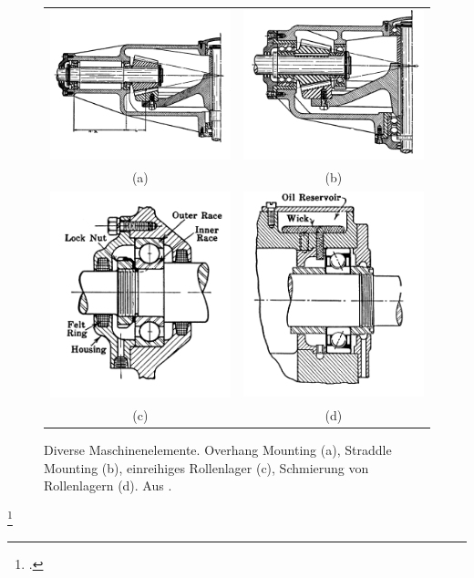 \begin{figure}
\centering\small
\begin{tabular}{cc}
  \includegraphics[width=.45\textwidth]{overhang-mounting} &
  \includegraphics[width=.45\textwidth]{straddle-mounting} \\
  (a) & (b)
\\[4pt]	%
  \includegraphics[width=.45\textwidth]{ball-bearing-1} &
  \includegraphics[width=.45\textwidth]{ball-bearing-2} \\
  (c) & (d)
\end{tabular}
%
\caption[]{Diverse Maschinenelemente.
Overhang Mounting (a), Straddle Mounting (b),
einreihiges Rollenlager (c), Schmierung von Rollenlagern (d).
Aus .\footnotemark }
\label{fig:Bearings}
\end{figure}
\footcitetext{Faires34}

